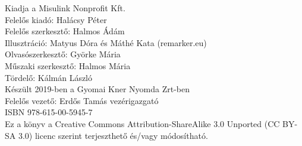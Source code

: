    
\cleardoublepage\null\vfill
\pagestyle{empty}
\begin{minipage}[b]{0.9\textwidth}
\footnotesize\raggedright
\setlength{\parskip}{0.5\baselineskip}
Kiadja a Misulink Nonprofit Kft.\\
Felelős kiadó: Halácsy Péter \\
Felelős szerkesztő: Halmos Ádám \\
Illusztráció: Matyus Dóra és Máthé Kata (remarker.eu) \\
Olvasószerkesztő: Györke Mária \\
Műszaki szerkesztő: Halmos Mária \\
Tördelő: Kálmán László\\
Készült 2019-ben a Gyomai Kner Nyomda Zrt-ben \\
Felelős vezető: Erdős Tamás  vezérigazgató \\
ISBN 978-615-00-5945-7\\
\smallskip
Ez a könyv a Creative Commons Attribution-ShareAlike 3.0 Unported (CC BY-SA 3.0) licenc szerint terjeszthető és/vagy módosítható.
\end{minipage}
\vspace*{2\baselineskip}


